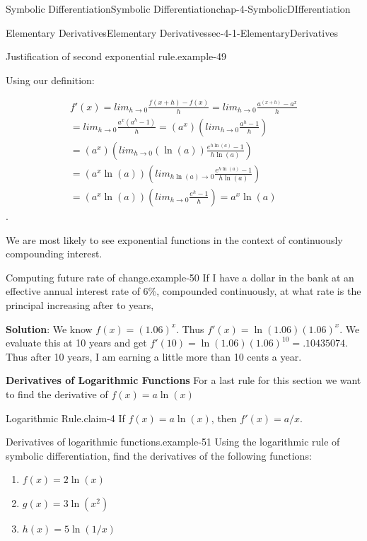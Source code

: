 \documentclass[oneside,10pt,]{book}
\newcommand{\terminology}[1]{\textbf{#1}}
\numberwithin{equation}{section}
\begin{document}
\begin{chapterptx}{Symbolic Differentiation}{}{Symbolic Differentiation}{}{}{chap-4-SymbolicDIfferentiation}
\begin{sectionptx}{Elementary Derivatives}{}{Elementary Derivatives}{}{}{sec-4-1-ElementaryDerivatives}
\begin{example}{Justification of second exponential rule.}{example-49}
\par
\hypertarget{p-1463}{}%
Using our definition:%
\par
\hypertarget{p-1464}{}%
%
\begin{gather*}
f'(x)=lim_{h\to0}\frac{f(x+h)-f(x)}{h}
=lim_{h\to0}\frac{a^{(x+h)}-a^x}{h}\\
=lim_{h\to0}\frac{a^x(a^h-1)}{h}
=(a^x)\left(lim_{h\to0}\frac{a^h-1}{h}\right)\\
=(a^x)\left(lim_{h\to0}(\ln(a))\frac{e^{h\ln(a)}-1}{h\ln(a)}\right)\\
=(a^x\ln(a))\left(lim_{h\ln(a)\to0}\frac{e^{h\ln(a)}-1}{h\ln(a)}\right)\\
=(a^x\ln(a))\left(lim_{h\to0}\frac{e^{h}-1}{h}\right)
=a^x\ln(a)
\end{gather*}
%
.\end{example}
\hypertarget{p-1465}{}%
We are most likely to see exponential functions in the context of continuously compounding interest.%
\begin{example}{Computing future rate of change.}{example-50}%
\hypertarget{p-1466}{}%
If I have a dollar in the bank at an effective annual interest rate of 6\%, compounded continuously, at what rate is the principal increasing after to years,%
\par
\hypertarget{p-1467}{}%
\terminology{Solution}: We know \(f(x)=(1.06)^x\).  Thus \(f'(x)=\ln(1.06)(1.06)^x\).  We evaluate this at 10 years and get \(f'(10)=\ln(1.06)(1.06)^{10}=.10435074\).  Thus after 10 years, I am earning a little more than 10 cents a year.%
\end{example}
\terminology{Derivatives of Logarithmic Functions}\hypertarget{p-1468}{}%
For a last rule for this section we want to find the derivative of \(f(x)=a \ln(x)\)%
\begin{claim}{Logarithmic Rule.}{}{claim-4}%
\hypertarget{p-1469}{}%
If \(f(x)=a \ln(x)\), then \(f'(x)=a/x\).%
\end{claim}
\begin{example}{Derivatives of logarithmic functions.}{example-51}%
\hypertarget{p-1470}{}%
Using the logarithmic rule of symbolic differentiation, find the derivatives of the following functions:%
\leavevmode%
\begin{enumerate}[label=(\alph*)]
\item\hypertarget{li-469}{}\(f(x)=2 \ln(x)\)%
\item\hypertarget{li-470}{}\(g(x)=3 \ln(x^2)\)%
\item\hypertarget{li-471}{}\(h(x)=5 \ln(1/x)\)%
\end{enumerate}

\end{example}
\end{sectionptx}
\end{chapterptx}
\end{document}
